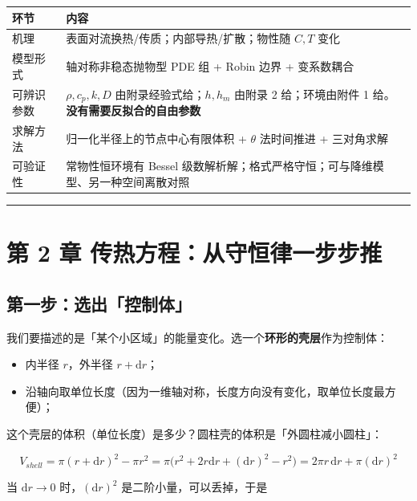 \begin{center}
\small
\begin{tabular}{ll}
\toprule
环节 & 内容 \\
\midrule
机理 & 表面对流换热/传质；内部导热/扩散；物性随 $C,T$ 变化 \\
模型形式 & 轴对称非稳态抛物型 PDE 组 + Robin 边界 + 变系数耦合 \\
可辨识参数 & $\rho,c_p,k,D$ 由附录经验式给；$h,h_m$ 由附录 2 给；环境由附件 1 给。\textbf{没有需要反拟合的自由参数} \\
求解方法 & 归一化半径上的节点中心有限体积 + $\theta$ 法时间推进 + 三对角求解 \\
可验证性 & 常物性恒环境有 Bessel 级数解析解；格式严格守恒；可与降维模型、另一种空间离散对照 \\
\bottomrule
\end{tabular}
\end{center}


\vspace{1mm}\hrule\vspace{1mm}


\section{第 2 章 传热方程：从守恒律一步步推}


\subsection{第一步：选出「控制体」}


我们要描述的是「某个小区域」的能量变化。选一个\textbf{环形的壳层}作为控制体：


\begin{itemize}
\item 内半径 $r$，外半径 $r+\mathrm{d} r$；
\item 沿轴向取单位长度（因为一维轴对称，长度方向没有变化，取单位长度最方便）；
\end{itemize}


这个壳层的体积（单位长度）是多少？圆柱壳的体积是「外圆柱减小圆柱」：


\begin{equation*}
V_{shell}=\pi(r+\mathrm{d} r)^2-\pi r^2=\pi\big(r^2+2r\mathrm{d} r+(\mathrm{d} r)^2-r^2\big)=2\pi r\,\mathrm{d} r+\pi(\mathrm{d} r)^2
\end{equation*}


当 $\mathrm{d} r\to0$ 时，$(\mathrm{d} r)^2$ 是二阶小量，可以丢掉，于是


